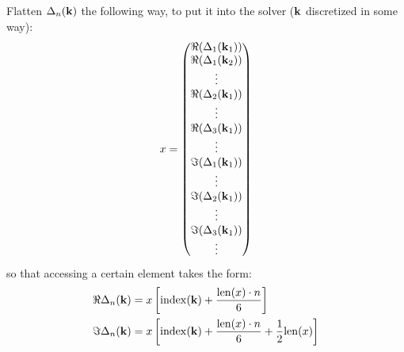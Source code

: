 \documentclass[../main.tex]{subfiles}
\begin{document}
Flatten \(\Delta_n (\bm{\mathrm{k}})\) the following way, to put it into the solver (\(\bm{\mathrm{k}}\) discretized in some way):
\begin{equation}
    x = \begin{pmatrix}
        \Re{(\Delta_1 (\bm{\mathrm{k}}_1))} \\
        \Re{(\Delta_1 (\bm{\mathrm{k}}_2))} \\
        \vdots \\
        \Re{(\Delta_2(\bm{\mathrm{k}}_1))} \\
        \vdots \\
        \Re{(\Delta_3(\bm{\mathrm{k}}_1))} \\
        \vdots \\
        \Im{(\Delta_1(\bm{\mathrm{k}}_1))} \\
        \vdots \\
        \Im{(\Delta_2(\bm{\mathrm{k}}_1))} \\
        \vdots \\
        \Im{(\Delta_3(\bm{\mathrm{k}}_1))} \\
        \vdots \\
    \end{pmatrix}
\end{equation}
so that accessing a certain element takes the form:
\begin{align}
    \Re{\Delta_n (\bm{\mathrm{k}})} &= x\left[\mathrm{index}(\bm{\mathrm{k}}) + \frac{\mathrm{len}(x) \cdot n}{6} \right] \\
    \Im{\Delta_n (\bm{\mathrm{k}})} &= x\left[\mathrm{index}(\bm{\mathrm{k}}) + \frac{\mathrm{len}(x) \cdot n}{6} + \frac{1}{2} \mathrm{len}(x) \right]
\end{align}
\end{document}
